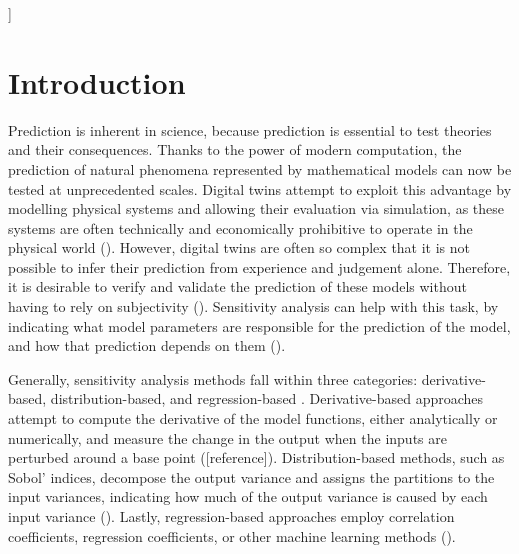 \documentclass[twocolumn]{rps-esrel2022}
\begin{document}

]

\section{Introduction}

Prediction is inherent in science, because prediction is essential to test theories and their consequences.
Thanks to the power of modern computation, the prediction of natural phenomena represented by mathematical models can now be tested at unprecedented scales.
Digital twins attempt to exploit this advantage by modelling physical systems and allowing their evaluation via simulation, as these systems are often technically and
economically prohibitive to operate in the physical world (\cite{wagg2020digital}).
However, digital twins are often so complex that it is not possible to infer their prediction from experience and judgement alone.
Therefore, it is desirable to verify and validate the prediction of these models without having to rely on subjectivity (\cite{JRC122132}).
Sensitivity analysis can help with this task, by indicating what model parameters are responsible for the prediction of the model, and how
that prediction depends on them (\cite{saltelli2004sensitivity}).

Generally, sensitivity analysis methods fall within three categories: derivative-based, distribution-based, and regression-based \cite{razavi2021future}.
Derivative-based approaches attempt to compute the derivative of the model functions, either analytically or numerically, and measure the change in
the output when the inputs are perturbed around a base point ([reference]).
Distribution-based methods, such as Sobol' indices, decompose the output variance and assigns the partitions to the input variances, indicating how much
of the output variance is caused by each input variance (\cite{saltelli2010variance}).
Lastly, regression-based approaches employ correlation coefficients, regression coefficients, or other machine learning methods (\cite{sudret2008global}).
\end{document}
